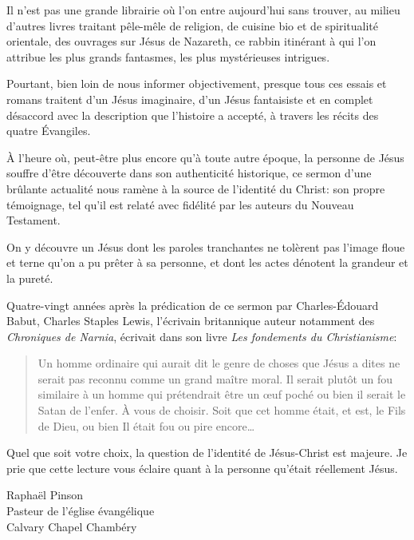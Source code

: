 
\begin{preface}
Il n'est pas une grande librairie où l'on entre aujourd'hui sans trouver,
au milieu d'autres livres traitant pêle-mêle de religion, de cuisine bio et de spiritualité orientale,
des ouvrages sur Jésus de Nazareth, ce rabbin itinérant à qui l'on attribue les plus grands
fantasmes, les plus mystérieuses intrigues.

Pourtant, bien loin de nous informer objectivement, presque tous ces essais et romans
traitent d'un Jésus imaginaire, d'un Jésus fantaisiste et en complet désaccord avec
la description que l'histoire a accepté, à travers les récits des quatre \'Evangiles.

\`A l'heure où, peut-être plus encore qu'à toute autre époque, la personne de Jésus
souffre d'être découverte dans son authenticité historique, ce sermon d'une brûlante actualité
nous ramène à la source de l'identité du Christ: son propre témoignage,
tel qu'il est relaté avec fidélité par les auteurs du Nouveau Testament.

On y découvre un Jésus dont les paroles tranchantes ne tolèrent pas l'image
floue et terne qu'on a pu prêter à sa personne,
et dont les actes dénotent la grandeur et la pureté.

Quatre-vingt années après la prédication de ce sermon par Charles-\'Edouard Babut, Charles Staples Lewis,
l'écrivain britannique auteur notamment des \emph{Chroniques de Narnia}, écrivait dans son livre
\emph{Les fondements du Christianisme}:

\begin{quote}
\quotefont
Un homme ordinaire qui aurait dit le genre de choses que Jésus
a dites ne serait pas reconnu comme un grand maître moral.
Il serait plutôt un fou \ocadr similaire à un homme qui prétendrait être un œuf poché \fcadr ou bien il serait le Satan de l'enfer.
À vous de choisir. Soit que cet homme était, et est, le Fils de Dieu, ou bien Il était fou ou pire encore…
\end{quote}


Quel que soit votre choix, la question de l'identité de Jésus-Christ est majeure. Je prie que cette lecture vous éclaire quant à la personne qu'était réellement Jésus.


\begin{flushright}
Raphaël Pinson\\
Pasteur de l'église évangélique\\
Calvary Chapel Chambéry
\end{flushright}

\end{preface}


